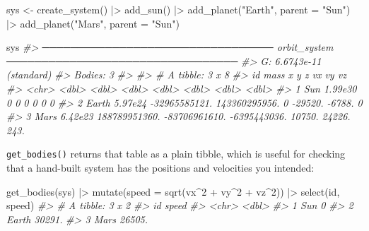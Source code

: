 \documentclass[
  10.5pt,
  letterpaper,
]{scrbook}
\newenvironment{Shaded}{\begin{snugshade}}{\end{snugshade}}
\newcommand{\AttributeTok}[1]{\textcolor[rgb]{0.00,0.00,0.00}{#1}}
\newcommand{\CommentTok}[1]{\textcolor[rgb]{0.00,0.00,0.00}{\textit{#1}}}
\newcommand{\DecValTok}[1]{\textcolor[rgb]{0.00,0.00,0.00}{#1}}
\newcommand{\FunctionTok}[1]{\textcolor[rgb]{0.00,0.00,0.00}{#1}}
\newcommand{\NormalTok}[1]{\textcolor[rgb]{0.00,0.00,0.00}{#1}}
\newcommand{\OtherTok}[1]{\textcolor[rgb]{0.00,0.00,0.00}{#1}}
\newcommand{\SpecialCharTok}[1]{\textcolor[rgb]{0.00,0.00,0.00}{#1}}
\newcommand{\StringTok}[1]{\textcolor[rgb]{0.00,0.00,0.00}{#1}}
\theoremstyle{plain}
\theoremstyle{remark}
\begin{document}
\begin{Shaded}
\begin{Highlighting}[]
\NormalTok{sys }\OtherTok{\textless{}{-}} \FunctionTok{create\_system}\NormalTok{() }\SpecialCharTok{|\textgreater{}}
  \FunctionTok{add\_sun}\NormalTok{() }\SpecialCharTok{|\textgreater{}}
  \FunctionTok{add\_planet}\NormalTok{(}\StringTok{"Earth"}\NormalTok{, }\AttributeTok{parent =} \StringTok{"Sun"}\NormalTok{) }\SpecialCharTok{|\textgreater{}}
  \FunctionTok{add\_planet}\NormalTok{(}\StringTok{"Mars"}\NormalTok{,  }\AttributeTok{parent =} \StringTok{"Sun"}\NormalTok{)}

\NormalTok{sys}
\CommentTok{\#\textgreater{} ───────────────────────────────── orbit\_system ───────────────────────────────── }
\CommentTok{\#\textgreater{} G: 6.6743e{-}11 (standard)}
\CommentTok{\#\textgreater{} Bodies: 3}
\CommentTok{\#\textgreater{} }
\CommentTok{\#\textgreater{} \# A tibble: 3 x 8}
\CommentTok{\#\textgreater{}   id       mass             x             y            z      vx     vy    vz}
\CommentTok{\#\textgreater{}   \textless{}chr\textgreater{}   \textless{}dbl\textgreater{}         \textless{}dbl\textgreater{}         \textless{}dbl\textgreater{}        \textless{}dbl\textgreater{}   \textless{}dbl\textgreater{}  \textless{}dbl\textgreater{} \textless{}dbl\textgreater{}}
\CommentTok{\#\textgreater{} 1 Sun   1.99e30            0             0            0       0      0     0 }
\CommentTok{\#\textgreater{} 2 Earth 5.97e24 {-}32965585121. 143360295956.           0  {-}29520. {-}6788.    0 }
\CommentTok{\#\textgreater{} 3 Mars  6.42e23 188789951360. {-}83706961610. {-}6395443036.  10750. 24226.  243.}
\end{Highlighting}
\end{Shaded}

\texttt{get\_bodies()} returns that table as a plain tibble, which is
useful for checking that a hand-built system has the positions and
velocities you intended:

\begin{Shaded}
\begin{Highlighting}[]
\FunctionTok{get\_bodies}\NormalTok{(sys) }\SpecialCharTok{|\textgreater{}}
  \FunctionTok{mutate}\NormalTok{(}\AttributeTok{speed =} \FunctionTok{sqrt}\NormalTok{(vx}\SpecialCharTok{\^{}}\DecValTok{2} \SpecialCharTok{+}\NormalTok{ vy}\SpecialCharTok{\^{}}\DecValTok{2} \SpecialCharTok{+}\NormalTok{ vz}\SpecialCharTok{\^{}}\DecValTok{2}\NormalTok{)) }\SpecialCharTok{|\textgreater{}}
  \FunctionTok{select}\NormalTok{(id, speed)}
\CommentTok{\#\textgreater{} \# A tibble: 3 x 2}
\CommentTok{\#\textgreater{}   id     speed}
\CommentTok{\#\textgreater{}   \textless{}chr\textgreater{}  \textless{}dbl\textgreater{}}
\CommentTok{\#\textgreater{} 1 Sun       0 }
\CommentTok{\#\textgreater{} 2 Earth 30291.}
\CommentTok{\#\textgreater{} 3 Mars  26505.}
\end{Highlighting}
\end{Shaded}
\end{document}
